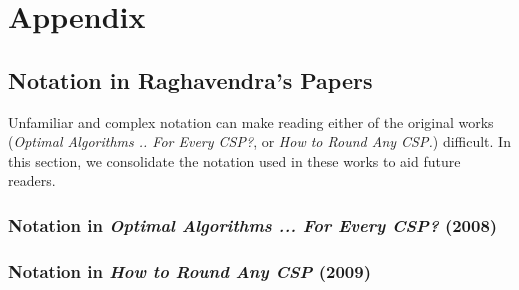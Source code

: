\section*{Appendix}
\subsection*{Notation in Raghavendra's Papers}
Unfamiliar and complex notation can make reading either of the original works (\textit{Optimal Algorithms .. For Every CSP?}, or \textit{How to Round Any CSP.}) difficult. In this section, we consolidate the notation used in these works to aid future readers.

\subsubsection*{Notation in \textit{Optimal Algorithms ... For Every CSP?} (2008)}

\subsubsection*{Notation in \textit{How to Round Any CSP} (2009)}